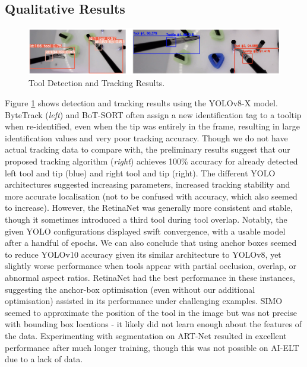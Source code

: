 \normalsize

\subsection{Qualitative Results}

\begin{figure}[htbp]
    \centering
    \vspace*{-3mm}
    \includegraphics[width=1\linewidth]{test5_results.png}
    \vspace*{-7.5mm}
    \caption{Tool Detection and Tracking Results.}
    \vspace*{-2.5mm}
    \label{fig:test5_results}
\end{figure}

Figure \ref{fig:test5_results} shows detection and tracking results using the YOLOv8-X model. ByteTrack (\textit{left}) and BoT-SORT often assign a new identification tag to a tooltip when re-identified, even when the tip was entirely in the frame, resulting in large identification values and very poor tracking accuracy. Though we do not have actual tracking data to compare with, the preliminary results suggest that our proposed tracking algorithm (\textit{right}) achieves 100\% accuracy for already detected left tool and tip (blue) and right tool and tip (right). The different YOLO architectures suggested increasing parameters, increased tracking stability and more accurate localisation (not to be confused with accuracy, which also seemed to increase). However, the RetinaNet was generally more consistent and stable, though it sometimes introduced a third tool during tool overlap. Notably, the given YOLO configurations displayed swift convergence, with a usable model after a handful of epochs. We can also conclude that using anchor boxes seemed to reduce YOLOv10 accuracy given its similar architecture to YOLOv8, yet slightly worse performance when tools appear with partial occlusion, overlap, or abnormal aspect ratios. RetinaNet had the best performance in these instances, suggesting the anchor-box optimisation (even without our additional optimisation) assisted in its performance under challenging examples. SIMO seemed to approximate the position of the tool in the image but was not precise with bounding box locations - it likely did not learn enough about the features of the data. Experimenting with segmentation on ART-Net resulted in excellent performance after much longer training, though this was not possible on AI-ELT due to a lack of data.

